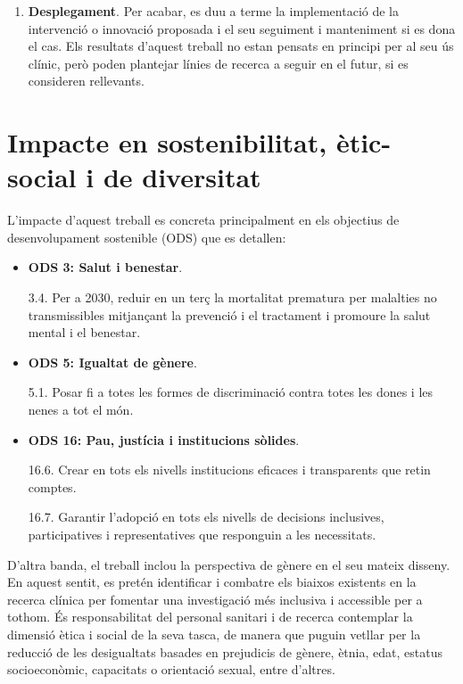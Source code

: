 \documentclass[CAT]{TFUOC}%
\begin{document}
\begin{enumerate}
\item
  \textbf{Desplegament}. Per acabar, es duu a terme la implementació de la intervenció o innovació proposada i el seu seguiment i manteniment si es dona el cas. Els resultats d'aquest treball no estan pensats en principi per al seu ús clínic, però poden plantejar línies de recerca a seguir en el futur, si es consideren rellevants.
\end{enumerate}

\section{Impacte en sostenibilitat, ètic-social i de diversitat}\label{impacte-en-sostenibilitat-uxe8tic-social-i-de-diversitat}

L'impacte d'aquest treball es concreta principalment en els objectius de desenvolupament sostenible (ODS) que es detallen:

\begin{itemize}
\item
  \textbf{ODS 3: Salut i benestar}.

  3.4. Per a 2030, reduir en un terç la mortalitat prematura per malalties no transmissibles mitjançant la prevenció i el tractament i promoure la salut mental i el benestar.
\item
  \textbf{ODS 5: Igualtat de gènere}.

  5.1. Posar fi a totes les formes de discriminació contra totes les dones i les nenes a tot el món.
\item
  \textbf{ODS 16: Pau, justícia i institucions sòlides}.

  16.6. Crear en tots els nivells institucions eficaces i transparents que retin comptes.

  16.7. Garantir l'adopció en tots els nivells de decisions inclusives, participatives i representatives que responguin a les necessitats.
\end{itemize}

D'altra banda, el treball inclou la perspectiva de gènere en el seu mateix disseny. En aquest sentit, es pretén identificar i combatre els biaixos existents en la recerca clínica per fomentar una investigació més inclusiva i accessible per a tothom. És responsabilitat del personal sanitari i de recerca contemplar la dimensió ètica i social de la seva tasca, de manera que puguin vetllar per la reducció de les desigualtats basades en prejudicis de gènere, ètnia, edat, estatus socioeconòmic, capacitats o orientació sexual, entre d'altres.
\end{document}
